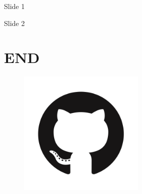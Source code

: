 \documentclass[8pt]{beamer}
\begin{document}

\begin{frame}{Slide 1}

\end{frame}


\begin{frame}{Slide 2}

\end{frame}


\section{\Huge{END}}



\begin{frame}{}

	\thispagestyle{empty}

	\begin{figure}
		\includegraphics[width=6cm]{beamertheme/logo.png}
	\end{figure}

\end{frame}

\end{document}
